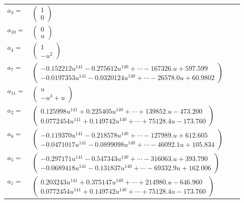 \documentclass[1p]{elsarticle_modified}
\theoremstyle{definition}
\begin{document}
\begin{tabular}{m{7pt} m{180pt} m{7pt} m{180pt} }
\flushright $a_{3}=$&$\begin{pmatrix}1\\0\end{pmatrix}$ \\
\flushright $a_{10}=$&$\begin{pmatrix}0\\u\end{pmatrix}$ \\
\flushright $a_{4}=$&$\begin{pmatrix}1\\- u^2\end{pmatrix}$ \\
\flushright $a_{7}=$&$\begin{pmatrix}-0.152212 u^{141}-0.275612 u^{140}+\cdots-167326. u+597.599\\-0.0197353 u^{141}-0.0320124 u^{140}+\cdots-26578.0 u+60.9802\end{pmatrix}$ \\
\flushright $a_{11}=$&$\begin{pmatrix}u\\- u^3+u\end{pmatrix}$ \\
\flushright $a_{2}=$&$\begin{pmatrix}0.125998 u^{141}+0.225405 u^{140}+\cdots+139852. u-473.200\\0.0772454 u^{141}+0.149742 u^{140}+\cdots+75128.4 u-173.760\end{pmatrix}$ \\
\flushright $a_{8}=$&$\begin{pmatrix}-0.119370 u^{141}-0.218578 u^{140}+\cdots-127989. u+612.605\\-0.0471017 u^{141}-0.0899098 u^{140}+\cdots-46092.1 u+105.834\end{pmatrix}$ \\
\flushright $a_{5}=$&$\begin{pmatrix}-0.297171 u^{141}-0.547343 u^{140}+\cdots-316063. u+393.790\\-0.0689418 u^{141}-0.131837 u^{140}+\cdots-69332.9 u+162.006\end{pmatrix}$ \\
\flushright $a_{1}=$&$\begin{pmatrix}0.203243 u^{141}+0.375147 u^{140}+\cdots+214980. u-646.960\\0.0772454 u^{141}+0.149742 u^{140}+\cdots+75128.4 u-173.760\end{pmatrix}$ \\

\end{tabular}
\end{document}

